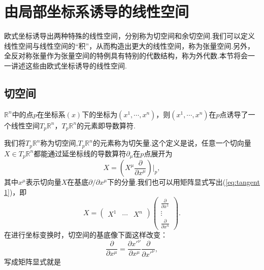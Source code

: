 \section{由局部坐标系诱导的线性空间}
    欧式坐标诱导出两种特殊的线性空间，分别称为切空间和余切空间.我们可以定义线性空间与线性空间的“积”，从而构造出更大的线性空间，称为张量空间.另外，全反对称张量作为张量空间的特例具有特别的代数结构，称为外代数.本节将会一一讲述这些由欧式坐标诱导的线性空间.
    \subsection{切空间}
        \begin{definition}
            $\mathbb{R}^n$中的点$p$在坐标系$(x)$下的坐标为$(x^1,\cdots,x^n)$，则$(x^1,\cdots,x^n)$在$p$点诱导了一个线性空间$T_p\mathbb{R}^n$，$T_p\mathbb{R}^n$的元素即导数算符.
        \end{definition}
        我们将$T_p\mathbb{R}^n$称为切空间,$T_p\mathbb{R}^n$的元素称为切矢量.这个定义是说，任意一个切向量$X\in T_p\mathbb{R}^n$都能通过延坐标线的导数算符$\partial_\mu$在$p$点展开为
        \begin{equation}\label{eq:tangent 1}
            X=\left(X^\mu\frac{\partial}{\partial x^\mu}\right)\Bigg|_p,
        \end{equation}
        其中$x^\mu$表示切向量$X$在基底$\partial/\partial x^\mu$下的分量.我们也可以用矩阵显式写出(\ref{eq:tangent 1})，即
        \begin{equation}\label{eq:tangent 2}
            X=
            \begin{pmatrix}
                X^1&\cdots&X^n	
            \end{pmatrix}
            \begin{pmatrix}
                \frac{\partial}{\partial x^1}\\
                \vdots\\
                \frac{\partial}{\partial x^n}	
            \end{pmatrix}.
        \end{equation}
        在进行坐标变换时，切空间的基底像下面这样改变：
        \begin{equation}\label{eq:tangent 3}
            \frac{\partial}{\partial x^\mu}=\frac{\partial x'^\nu}{\partial x^\mu}\frac{\partial}{\partial x'^\nu},
        \end{equation}
        写成矩阵显式就是
